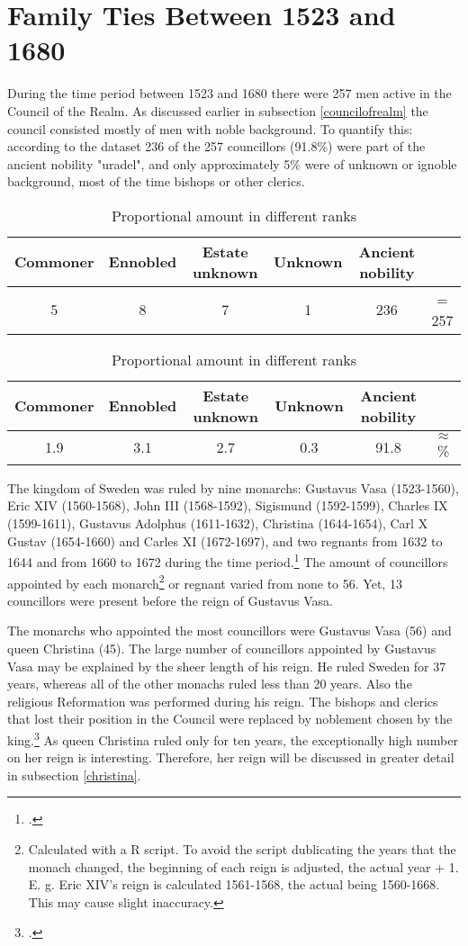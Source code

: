 \section{Family Ties Between 1523 and 1680}
During the time period between 1523 and 1680 there were 257 men active in the Council of the Realm. As discussed earlier in subsection \ref{councilofrealm} the council consisted mostly of men with noble background. To quantify this: according to the dataset 236 of the 257 councillors (91.8\%) were part of the ancient nobility "uradel", and only approximately 5\% were of unknown or ignoble background, most of the time bishops or other clerics.  

\begin{table}
	\caption[Absolute amount in different ranks]{Absolute amount in different ranks (Data by \cite{councillorsDS}, statistics by author)}
	\centering
	\begin{tabular}{cccccc}
		\hline
		Commoner & Ennobled & Estate unknown & Unknown & Ancient nobility & \\
		\hline
		5 & 8 & 7 & 1 & 236 & = 257 \\
		\hline
	\end{tabular}
	\caption{Proportional amount in different ranks}
	\centering
	\begin{tabular}{cccccc}
		\hline
	    Commoner & Ennobled & Estate unknown & Unknown & Ancient nobility & \\
	    \hline
	    1.9 & 3.1 & 2.7 & 0.3 & 91.8 & $\approx$ \% \\
	\end{tabular}
\end{table}

The kingdom of Sweden was ruled by nine monarchs: Gustavus Vasa (1523-1560), Eric XIV (1560-1568), John III (1568-1592), Sigismund (1592-1599), Charles IX (1599-1611), Gustavus Adolphus (1611-1632), Christina (1644-1654), Carl X Gustav (1654-1660) and Carles XI (1672-1697), and two regnants from 1632 to 1644 and from 1660 to 1672 during the time period.\footcite[p. 11]{lappalainen06} The amount of councillors appointed by each monarch\footnote{Calculated with a R script. To avoid the script dublicating the years that the monach changed, the beginning of each reign is adjusted, the actual year + 1. E. g. Eric XIV's reign is calculated 1561-1568, the actual being 1560-1668. This may cause slight inaccuracy.} or regnant varied from none to 56. Yet, 13 councillors were present before the reign of Gustavus Vasa.

The monarchs who appointed the most councillors were Gustavus Vasa (56) and queen Christina (45). The large number of councillors appointed by Gustavus Vasa may be explained by the sheer length of his reign. He ruled Sweden for 37 years, whereas all of the other monachs ruled less than 20 years. Also the religious Reformation was performed during his reign. The bishops and clerics that lost their position in the Council were replaced by noblement chosen by the king.\footcite[TODO]{pSuurvalta} As queen Christina ruled only for ten years, the exceptionally high number on her reign is interesting. Therefore, her reign will be discussed in greater detail in subsection \ref{christina}. 

